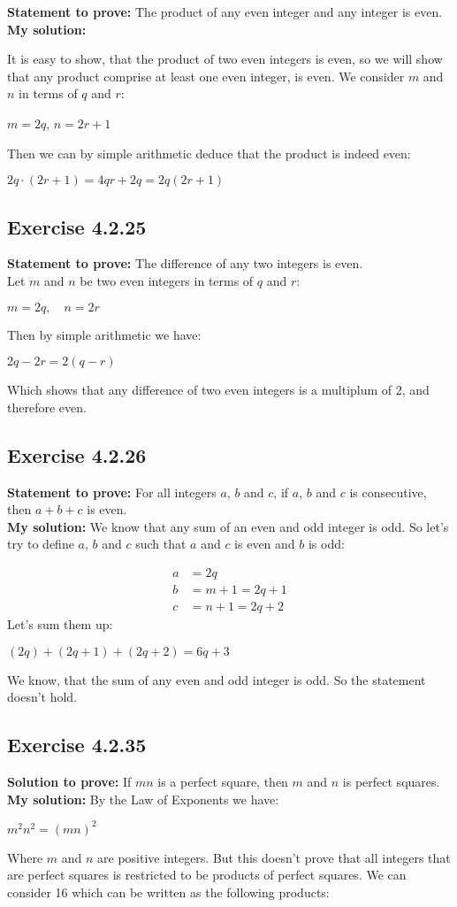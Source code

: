 \documentclass{article}
\newcommand{\cent}[1]{\begin{center}#1\end{center}}
\newcommand{\mAlign}[1]{\begin{align*}#1\end{align*}}
\newcommand{\Prove}{\textbf{Statement to prove: }}
\newcommand{\Solution}{\textbf{My solution: }}
\newcommand{\QED}{\boxed{}}
\newcommand{\Exercise}[1]{\subsection{Exercise #1}}
\begin{document}
	\Prove
	The product of any even integer and any integer is even.\\
	
	\Solution
	
	It is easy to show, that the product of two even integers is even, so we will show that any product comprise at least one even integer, is even. We consider $m$ and $n$ in terms of $q$ and $r$:
	
	\cent{$m = 2q$, \quad $n = 2r+1$}
	
	Then we can by simple arithmetic deduce that the product is indeed even:
	
	\cent{$ 2q \cdot (2r+1) = 4qr+2q = 2q(2r+1) $}
	
	\QED
	
	\Exercise{4.2.25}
	
	\Prove
	The difference of any two integers is even.\\
	
	Let $m$ and $n$ be two even integers in terms of $q$ and $r$: 
	
	\cent{$m = 2q, \quad n = 2r$}
	
	Then by simple arithmetic we have:
	\cent{$2q - 2r = 2(q-r)$}
	
	Which shows that any difference of two even integers is a multiplum of 2, and therefore even.
	\QED
	
	\Exercise{4.2.26}
	\Prove
	For all integers $a$, $b$ and $c$, if $a$, $b$ and $c$ is consecutive, then $a+b+c$ is even.\\
	
	\Solution
	We know that any sum of an even and odd integer is odd. So let's try to define $a$, $b$ and $c$ such that $a$ and $c$ is even and $b$ is odd:
	
	\mAlign{a &= 2q\\
					b &= m + 1 = 2q+1 \\
					c &= n + 1 = 2q+2}
	Let's sum them up:
	
	\cent{$(2q) + (2q+1) + (2q+2) = 6q+3$}
	
	We know, that the sum of any even and odd integer is odd. So the statement doesn't hold.
	
	\QED
	
	\Exercise{4.2.35}
	\textbf{Solution to prove:}
	If $mn$ is a perfect square, then $m$ and $n$ is perfect squares.\\
	
	\Solution
	By the Law of Exponents we have:
	\cent{$ m^2 n^2=(mn)^2$}
	
	Where $m$ and $n$ are positive integers. But this doesn't prove that all integers that are perfect squares is restricted to be products of perfect squares. We can consider 16 which can be written as the following products:
	
\end{document}
